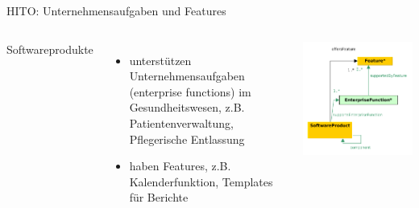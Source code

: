 \documentclass[aspectratio=1610,12pt]{beamer}
\newcommand{\enquote}[1]{{\glqq#1\grqq{}}}
\begin{document}
\begin{frame}{HITO: Unternehmensaufgaben und Features}
\begin{columns}
  Softwareprodukte
  \begin{itemize}
    \item unterstützen Unternehmensaufgaben (enterprise functions) im Gesundheitswesen, z.B. \enquote{Patientenverwaltung}, \enquote{Pflegerische Entlassung}
    \item haben Features, z.B. \enquote{Kalenderfunktion}, \enquote{Templates für Berichte}
  \end{itemize}
\includegraphics[width=\textwidth]{img/excerpt3.pdf}
\end{columns}
\end{frame}
\end{document}
